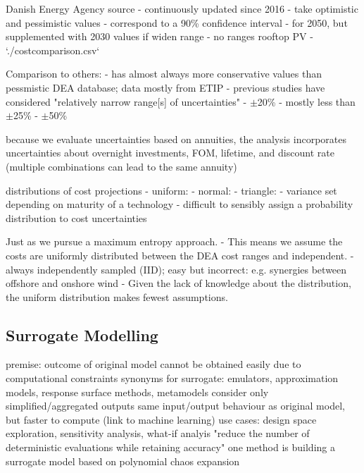 Danish Energy Agency source
- continuously updated since 2016
- take optimistic and pessimistic values
- correspond to a 90\% confidence interval
- for 2050, but supplemented with 2030 values if widen range
- no ranges rooftop PV
- `./costcomparison.csv`

Comparison to others:
- \cite{trondle_trade-offs_2020} has almost always more conservative values than pessmistic DEA database; data mostly from ETIP
- previous studies have considered "relatively narrow range[s] of uncertainties" \cite{Li2017}
- $\pm$20\% \cite{moret_characterization_2017}
- mostly less than $\pm$25\% \cite{pizarro-alonso_uncertainties_2019}
- $\pm$50\% \cite{shirizadeh_how_2019}

because we evaluate uncertainties based on annuities,
the analysis incorporates uncertainties about
overnight investments, FOM, lifetime, and discount rate
(multiple combinations can lead to the same annuity)


distributions of cost projections
- uniform: \cite{moret_characterization_2017,moret_robust_2016,shirizadeh_how_2019,trondle_trade-offs_2020,pilpola_analyzing_2020,Li2017,Trutnevyte2013,lopion_cost_2019}
- normal: \cite{mavromatidis_uncertainty_2018}
- triangle: \cite{li_using_2020}
- variance set depending on maturity of a technology \cite{li_using_2020}
- difficult to sensibly assign a probability distribution to cost uncertainties \cite{moret_robust_2016}

Just as \cite{trondle_trade-offs_2020} we pursue a maximum entropy approach. 
- This means we assume the costs are uniformly distributed between the DEA cost ranges and independent.
- always independently sampled (IID); easy but incorrect: e.g. synergies between offshore and onshore wind
- Given the lack of knowledge about the distribution, the uniform distribution makes fewest assumptions.

\subsection{Surrogate Modelling}
\label{sec:surrogate}

premise: outcome of original model cannot be obtained easily due to computational constraints
synonyms for surrogate: emulators, approximation models, response surface methods, metamodels
consider only simplified/aggregated outputs
same input/output behaviour as original model, but faster to compute (link to machine learning)
use cases: design space exploration, sensitivity analysis, what-if analyis
"reduce the number of deterministic evaluations while retaining accuracy" \cite{palar_multi-fidelity_2016}
one method is building a surrogate model based on polynomial chaos expansion

